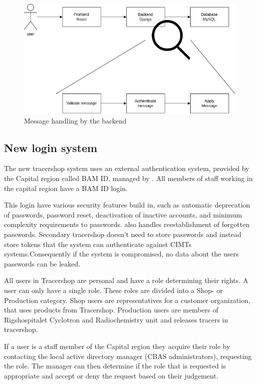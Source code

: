 \documentclass{article}
\begin{document}
\begin{figure}[ht]
  \begin{center}
    \includegraphics[width=0.6\linewidth]{MessageHandeling.png}
    \caption{Message handling by the backend}
    \label{fig:messageHandle}
  \end{center}
\end{figure}

\subsection*{New login system}

The new tracershop system uses an external authentication system, provided by
the Capital region called BAM ID, managed by . All members of staff
working in the capital region have a BAM ID login.

This login have various security features build in, such as automatic
deprecation of passwords, password reset, deactivation of inactive accounts, and
minimum complexity requirements to passwords.  also handles
reestablishment of forgotten passwords.
Secondary tracershop doesn't need to store passwords and instead store tokens
that the system can authenticate against CIMTs systems.Consequently if the
system is compromised, no data about the users passwords can be leaked.

All users in Tracershop are personal and have a role determining their
rights. A user can only have a single role.
These roles are divided into a Shop- or Production category. Shop users are
representatives for a customer organization, that uses products from Tracershop.
Production users are members of Rigshospitalet Cyclotron and Radiochemistry
unit and releases tracers in tracershop.

If a user is a staff member of the Capital region they acquire their role by
contacting the local active directory manager (CBAS administrators), requesting
the role. The manager can then determine if the role that is requested is
appropriate and accept or deny the request based on their judgement.
\end{document}
